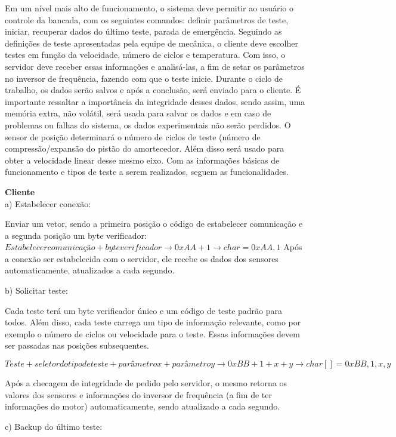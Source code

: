 	Em um nível mais alto de funcionamento, o sistema deve permitir ao usuário o controle da bancada, com os seguintes comandos: definir parâmetros de teste, iniciar, recuperar dados do último teste, parada de emergência.
	Seguindo as definições de teste apresentadas pela equipe de mecânica, o cliente deve escolher testes em função da velocidade, número de ciclos e temperatura.
	Com isso, o servidor deve receber essas informações e analisá-las, a fim de setar os parâmetros no inversor de frequência, fazendo com que o teste inicie. Durante o ciclo de trabalho, os dados serão salvos e após a conclusão, será enviado para o cliente. É importante ressaltar a importância da integridade desses dados, sendo assim, uma memória extra, não volátil, será usada para salvar os dados e em caso de problemas ou falhas do sistema, os dados experimentais não serão perdidos.
	O sensor de posição determinará o número de ciclos de teste (número de compressão/expansão do pistão do amortecedor. Além disso será usado para obter a velocidade linear desse mesmo eixo.
	Com as informações básicas de funcionamento e tipos de teste a serem realizados, seguem as funcionalidades.


	\textbf{Cliente}\\
	a) Estabelecer conexão:

	Enviar um vetor, sendo a primeira posição o código de estabelecer comunicação e a segunda posição um byte verificador:
		\textit{$Estabelecer comunicação + byte verificador \rightarrow 0xAA + 1 \rightarrow  char = {0xAA, 1}$}
	Após a conexão ser estabelecida com o servidor, ele recebe os dados dos sensores automaticamente, atualizados a cada segundo.

	b) Solicitar teste:

	Cada teste terá um byte verificador único e um código de teste padrão para todos. Além disso, cada teste carrega um tipo de informação relevante, como por exemplo o número de ciclos ou velocidade para o teste. Essas informações devem ser passadas nas posições subsequentes.

		\textit{$Teste + seletor do tipo de teste + parâmetro x + parâmetro y \rightarrow 0xBB + 1 + x + y \rightarrow char[] = {0xBB, 1, x, y}$}
		
	Após a checagem de integridade de pedido pelo servidor, o mesmo retorna os valores dos sensores e informações do inversor de frequência (a fim de ter informações do motor) automaticamente, sendo atualizado a cada segundo.

	c) Backup do último teste:

